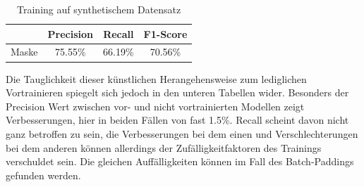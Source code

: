 \begin{table}[h!]
    \centering
    \begin{minipage}{0.475\textwidth}
        \centering
        \begin{tabular}{|l|c|c|c|}
            \hline
            \rowcolor[HTML]{EFEFEF}
                  & Precision & Recall  & F1-Score \\ \hline
            Maske & 75.55\%   & 66.19\% & 70.56\%  \\ \hline
        \end{tabular}
        \caption{Training auf synthetischem Datensatz}
    \end{minipage}%
\end{table}

Die Tauglichkeit dieser künstlichen Herangehensweise zum lediglichen Vortrainieren spiegelt sich jedoch in den unteren Tabellen wider. Besonders der Precision Wert zwischen vor- und nicht vortrainierten Modellen zeigt Verbesserungen, hier in beiden Fällen von fast 1.5\%. Recall scheint davon nicht ganz betroffen zu sein, die Verbesserungen bei dem einen und Verschlechterungen bei dem anderen können allerdings der Zufälligkeitfaktoren des Trainings verschuldet sein. Die gleichen Auffälligkeiten können im Fall des Batch-Paddings gefunden werden.

